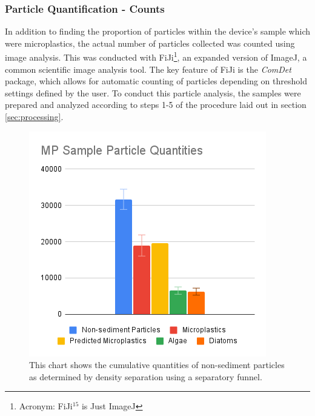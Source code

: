 \documentclass[fleqn,10pt]{SelfArx} %
\begin{document}
	\subsubsection{Particle Quantification - Counts}
	In addition to finding the proportion of particles within the device's sample which were microplastics, the actual number of particles collected was counted using image analysis. This was conducted with FiJi\footnote{Acronym: FiJi$^{15}$ is Just ImageJ}, an expanded version of ImageJ, a common scientific image analysis tool. The key feature of FiJi is the \textit{ComDet} package, which allows for automatic counting of particles depending on threshold settings defined by the user. To conduct this particle analysis, the samples were prepared and analyzed according to steps 1-5 of the procedure laid out in section \ref{sec:processing}. 
	\begin{figure}[H]
		\centering
		\includegraphics[width=1\linewidth]{Figures/TotalQuantities}
		\caption[Cumulative Non-Sediment Particle Quantities]{This chart shows the cumulative quantities of non-sediment particles as determined by density separation using a separatory funnel.}
		\label{fig:totalcount}
	\end{figure}
	
\end{document}
